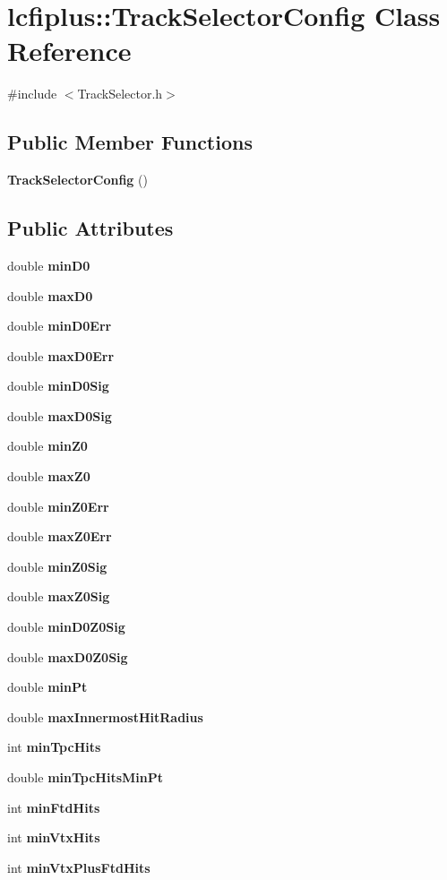 \section{lcfiplus\-:\-:Track\-Selector\-Config Class Reference}
\label{classlcfiplus_1_1TrackSelectorConfig}


{\ttfamily \#include $<$Track\-Selector.\-h$>$}

\subsection*{Public Member Functions}
\begin{DoxyCompactItemize}
\item 
{\bf Track\-Selector\-Config} ()
\end{DoxyCompactItemize}
\subsection*{Public Attributes}
\begin{DoxyCompactItemize}
\item 
double {\bf min\-D0}
\item 
double {\bf max\-D0}
\item 
double {\bf min\-D0\-Err}
\item 
double {\bf max\-D0\-Err}
\item 
double {\bf min\-D0\-Sig}
\item 
double {\bf max\-D0\-Sig}
\item 
double {\bf min\-Z0}
\item 
double {\bf max\-Z0}
\item 
double {\bf min\-Z0\-Err}
\item 
double {\bf max\-Z0\-Err}
\item 
double {\bf min\-Z0\-Sig}
\item 
double {\bf max\-Z0\-Sig}
\item 
double {\bf min\-D0\-Z0\-Sig}
\item 
double {\bf max\-D0\-Z0\-Sig}
\item 
double {\bf min\-Pt}
\item 
double {\bf max\-Innermost\-Hit\-Radius}
\item 
int {\bf min\-Tpc\-Hits}
\item 
double {\bf min\-Tpc\-Hits\-Min\-Pt}
\item 
int {\bf min\-Ftd\-Hits}
\item 
int {\bf min\-Vtx\-Hits}
\item 
int {\bf min\-Vtx\-Plus\-Ftd\-Hits}
\end{DoxyCompactItemize}



